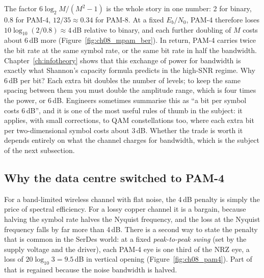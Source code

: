 
The factor $6\log_2M/(M^2-1)$ is the whole story in one number: 2 for binary, 0.8 for PAM-4,
$12/35\approx0.34$ for PAM-8. At a fixed $E_b/N_0$, PAM-4 therefore loses
$10\log_{10}(2/0.8)\approx4$\,dB relative to binary, and each further doubling of $M$ costs
about 6\,dB more (Figure~\ref{fig:ch08_mpam_ber}). In return, PAM-4 carries twice the bit rate
at the same symbol rate, or the same bit rate in half the bandwidth.
Chapter~\ref{ch:infotheory} shows that this exchange of power for bandwidth is exactly what
Shannon's capacity formula predicts in the high-SNR regime. Why 6\,dB per bit? Each extra bit
doubles the number of levels; to keep the same spacing between them you must double the
amplitude range, which is four times the power, or 6\,dB. Engineers sometimes summarise this
as ``a bit per symbol costs 6\,dB'', and it is one of the most useful rules of thumb in
the subject: it applies, with small corrections, to QAM constellations too, where each extra
bit per two-dimensional symbol costs about 3\,dB. Whether the trade is worth it depends
entirely on what the channel charges for bandwidth, which is the subject of the next
subsection.


\subsection{Why the data centre switched to PAM-4}

For a band-limited wireless channel with flat noise, the 4\,dB penalty is simply the price of
spectral efficiency. For a lossy copper channel it is a bargain, because halving the symbol
rate halves the Nyquist frequency, and the loss at the Nyquist frequency falls by far more than
4\,dB. There is a second way to state the penalty that is common in the SerDes world: at a fixed
\emph{peak-to-peak swing} (set by the supply voltage and the driver), each PAM-4 eye is one third
of the NRZ eye, a loss of $20\log_{10}3=9.5$\,dB in vertical opening
(Figure~\ref{fig:ch08_pam4}). Part of that is regained because the noise bandwidth is halved.


